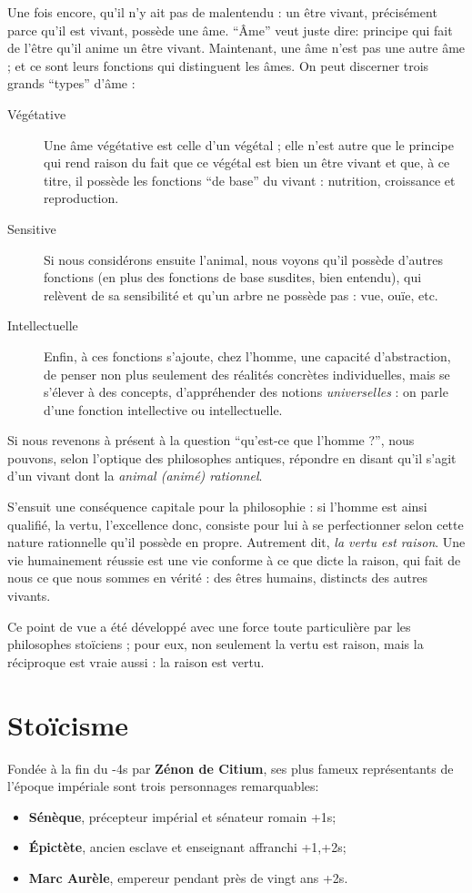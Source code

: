 Une fois encore, qu'il n'y ait pas de malentendu : un être vivant, précisément parce qu'il
est vivant, possède une âme. ``\^Ame'' veut juste dire: principe qui fait de l'être qu'il anime un
être vivant. Maintenant, une âme n'est pas une autre âme ; et ce sont leurs fonctions qui
distinguent les âmes. On peut discerner trois grands ``types'' d'âme :
\begin{description}
	\item [Végétative]
		Une âme végétative est celle d'un végétal ; elle n'est autre que le principe qui rend raison
		du fait que ce végétal est bien un être vivant et que, à ce titre, il possède les fonctions ``de
		base'' du vivant : nutrition, croissance et reproduction.
	\item [Sensitive]
		Si nous considérons ensuite
		l'animal, nous voyons qu'il possède d'autres fonctions (en plus des fonctions de base susdites, bien entendu), qui relèvent de sa sensibilité et qu'un arbre ne possède pas : vue,
		ouïe, etc.
	\item [Intellectuelle]
		Enfin, à ces fonctions s'ajoute, chez l'homme, une capacité d'abstraction, de
		penser non plus seulement des réalités concrètes individuelles, mais se s'élever à des
		concepts, d'appréhender des notions \textit{universelles} : on parle d'une fonction intellective ou
		intellectuelle.
\end{description}

Si nous revenons à présent à la question ``qu'est-ce que l'homme ?'', nous pouvons, selon l'optique des philosophes antiques, répondre en disant qu'il s'agit d'un vivant dont la \textit{animal (animé) rationnel}.

S'ensuit une conséquence capitale pour la philosophie : si l'homme est ainsi qualifié, la
vertu, l'excellence donc, consiste pour lui à se perfectionner selon cette nature rationnelle
qu'il possède en propre. Autrement dit, \textit{la vertu est raison}.
Une vie humainement réussie
est une vie conforme à ce que dicte la raison, qui fait de nous ce que nous sommes en vérité : des êtres humains, distincts des autres vivants.

Ce point de vue a été développé avec une force
toute particulière par les philosophes stoïciens ; pour eux, non seulement la vertu est raison, mais la réciproque est vraie aussi : la raison est vertu.

\section{Stoïcisme}
Fondée à la fin du -4s par \textbf{Zénon de Citium}, ses plus fameux représentants de l'époque
impériale sont trois personnages remarquables:
\begin{itemize}
	\item \textbf{Sénèque}, précepteur impérial et sénateur romain +1s;
	\item \textbf{Épictète}, ancien esclave et enseignant affranchi +1,+2s;
	\item \textbf{Marc Aurèle}, empereur pendant près de vingt ans +2s.
\end{itemize}

